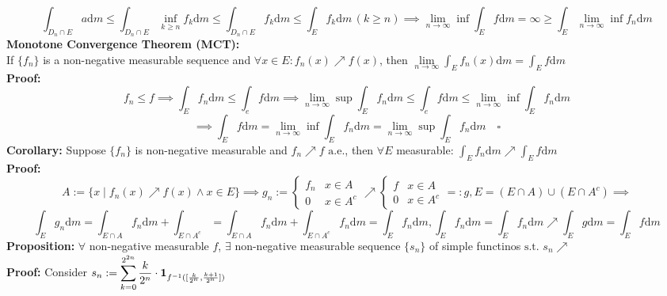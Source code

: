 \documentclass{article}
\newcommand{\limninf}{\lim\limits_{n\to\infty}}
\newcommand{\st}{\mbox{ s.t. }}
\newcommand{\0}{{\bf{0}}}
\newcommand{\1}{{\bf{1}}}
\newcommand{\alev}{\mbox{ a.e.}}
\newcommand{\dint}{\displaystyle\int}
\newcommand{\dif}{\mbox{d}}
\begin{document}
$$\int_{D_n\cap E}a\dif m\le\int_{D_n\cap E}\inf_{k\geq n}f_k\dif m\le\int_{D_n\cap E}f_k\dif m\le\int_Ef_k\dif m\,(k\geq n)\implies\limninf\inf\int_Ef\dif m=\infty\geq\int_E\limninf\inf f_n\dif m$$
\textbf{Monotone Convergence Theorem (MCT):}\\
If $\{f_n\}$ is a non-negative measurable sequence and $\forall x\in E:f_n(x)\nearrow f(x)$, then $\limninf\dint_Ef_n(x)\dif m=\dint_Ef\dif m$\\
\textbf{Proof:}
$$f_n\le f\implies\int_Ef_n\dif m\le\int_ef\dif m\implies\limninf\sup\int_Ef_n\dif m\le\int_ef\dif m\le\limninf\inf\int_Ef_n\dif m$$
$$\implies\int_Ef\dif m=\limninf\inf\int_Ef_n\dif m=\limninf\sup\int_Ef_n\dif m\quad\square$$
\textbf{Corollary:} Suppose $\{f_n\}$ is non-negative measurable and $f_n\nearrow f\alev$, then $\forall E$ measurable: $\dint_Ef_n\dif m\nearrow\dint_Ef\dif m$\\
\textbf{Proof:}
$$A:=\{x\mid f_n(x)\nearrow f(x)\land x\in E\}\implies g_n:=\begin{cases}
    f_n&x\in A\\
    0&x\in A^c
\end{cases}\nearrow\begin{cases}
    f&x\in A\\
    0&x\in A^c
\end{cases}=:g,E=(E\cap A)\cup(E\cap A^c)\implies$$
$$\int_Eg_n\dif m=\int_{E\cap A}f_n\dif m+\int_{E\cap A^c}=\int_{E\cap A}f_n\dif m+\int_{E\cap A^c}f_n\dif m=\int_Ef_n\dif m,\int_Ef_n\dif m=\int_Ef_n\dif m\nearrow\int_Eg\dif m=\int_Ef\dif m$$
\textbf{Proposition:} $\forall$ non-negative measurable $f$, $\exists$ non-negative measurable sequence $\{s_n\}$ of simple functinos$\st s_n\nearrow$\\
\textbf{Proof:} Consider $s_n:=\displaystyle\sum_{k=0}^{2^{2n}}\dfrac{k}{2^n}\cdot\1_{f^{-1}([\frac{k}{2^n},\frac{k+1}{2^n}])}$
\end{document}
